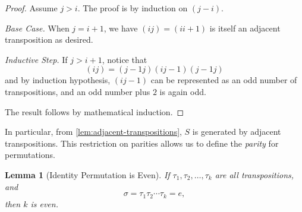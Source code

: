 \documentclass{article}
\newtheorem{lemma}[theorem]{Lemma}
\theoremstyle{definition}
\theoremstyle{remark}
\newcommand{\pqty}[1]{\left(#1\right)}
\newcommand{\perm}[1]{(#1)}
\begin{document}
\begin{proof}
    Assume \(j > i\). The proof is by induction on \(\pqty{j - i}\).
    
    \emph{Base Case.} When \(j = i + 1\), we have \(\perm{ij} = \perm{i {i + 1}}\) is itself an adjacent transposition as desired.

    \emph{Inductive Step.} If \(j > i + 1\), notice that
    \[
        \perm{i j} = \perm{{j - 1} j} \perm{i {j - 1}} \perm{{j - 1} j}
    \]
    and by induction hypothesis, \(\perm{i j - 1}\) can be represented as an odd number of transpositions, and an odd number plus \(2\) is again odd.

    The result follows by mathematical induction.
\end{proof}

In particular, from \autoref{lem:adjacent-transpositions}, \(S\) is generated by adjacent transpositions. This restriction on parities allows us to define the \emph{parity} for permutations.

\begin{lemma}[Identity Permutation is Even]
    \label{lem:identity-permutation-is-even}%
    If \(\tau_1, \tau_2, \ldots, \tau_k\) are all transpositions, and
    \[
        \sigma = \tau_1 \tau_2 \cdots \tau_k = e,
    \]
    then \(k\) is even.
\end{lemma}
\end{document}
